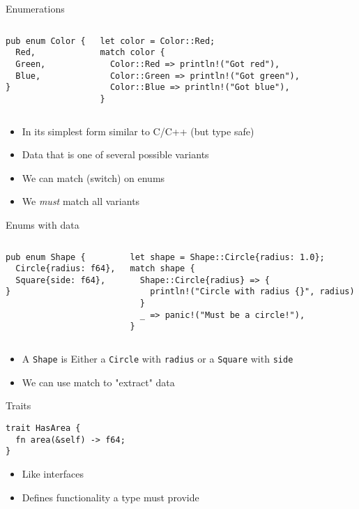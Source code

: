 \begin{frame}[fragile]{Enumerations}
\begin{columns}[t,onlytextwidth]
\begin{verbatim}
pub enum Color {
  Red,
  Green,
  Blue,
}
\end{verbatim}
\begin{verbatim}
let color = Color::Red;
match color {
  Color::Red => println!("Got red"),
  Color::Green => println!("Got green"),
  Color::Blue => println!("Got blue"),
}
\end{verbatim}
\end{columns}
  \begin{itemize}
    \item<1-> In its simplest form similar to C/C++ (but type safe)
	\item<1-> Data that is one of several possible variants
    \item<2> We can match (switch) on enums
    \item<2> We \emph{must} match all variants
  \end{itemize}
\end{frame}

\begin{frame}[fragile]{Enums with data}
\begin{columns}[t,onlytextwidth]
\begin{verbatim}
pub enum Shape {
  Circle{radius: f64},
  Square{side: f64},
}
\end{verbatim}
\pause\begin{verbatim}
let shape = Shape::Circle{radius: 1.0};
match shape {
  Shape::Circle{radius} => {
    println!("Circle with radius {}", radius)
  }
  _ => panic!("Must be a circle!"),
}
\end{verbatim}
\end{columns}
\begin{itemize}
  \item<1-> A \texttt{Shape} is Either a \texttt{Circle} with \texttt{radius} or a
    \texttt{Square} with \texttt{side}
  \item<2-> We can use match to "extract" data
\end{itemize}
\end{frame}



\begin{frame}[fragile]{Traits}
\begin{verbatim}
trait HasArea {
  fn area(&self) -> f64;
}
\end{verbatim}
\begin{itemize}
	\item Like interfaces
	\item Defines functionality a type must provide
\end{itemize}
\end{frame}

